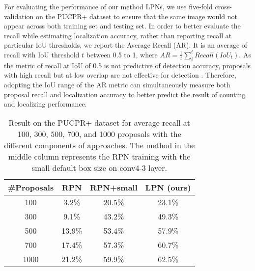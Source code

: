 \documentclass[10pt,twocolumn,letterpaper]{article}
\begin{document}
For evaluating the performance of our method LPNs, we use five-fold cross-validation on the PUCPR+ dataset to ensure that the same image would not appear across both training set and testing set. In order to better evaluate the recall while estimating localization accuracy, rather than reporting recall at particular IoU thresholds, we report the Average Recall (AR). It is an average of recall with IoU threshold $t$ between 0.5 to 1, where $AR = \frac{1}{t} \sum_{i}^{t} Recall(IoU_{t})$. As the metric of recall at IoU of 0.5 is not predictive of detection accuracy, proposals with high recall but at low overlap are not effective for detection \cite{42_hosang2016makes}. Therefore, adopting the IoU range of the AR metric can simultaneously measure both proposal recall and localization accuracy to better predict the result of counting and localizing performance.

\begin{table}[h]
	\caption{Result on the PUCPR+ \cite{01_de2015pklot} dataset for average recall at 100, 300, 500, 700, and 1000 proposals with the different components of approaches. The method in the middle column represents the RPN training with the small default box size on conv4-3 layer.}
\begin{center}
\begin{tabular}{|c|c|c|c|}
\hline
\#Proposals & RPN \cite{21_ren2015faster} & RPN+small & LPN (ours) \\
\hline\hline
100  & 3.2\% & 20.5\% & 23.1\% \\
\hline
300  & 9.1\% & 43.2\% & 49.3\% \\
\hline
500  & 13.9\% & 53.4\% & 57.9\% \\
\hline
700  & 17.4\% & 57.3\% & 60.7\% \\
\hline
1000 & 21.2\% & 59.9\% & 62.5\% \\
\hline
\end{tabular}
\end{center}
\label{table:t2}
\end{table}
\vspace{-0.5 cm}
\end{document}
